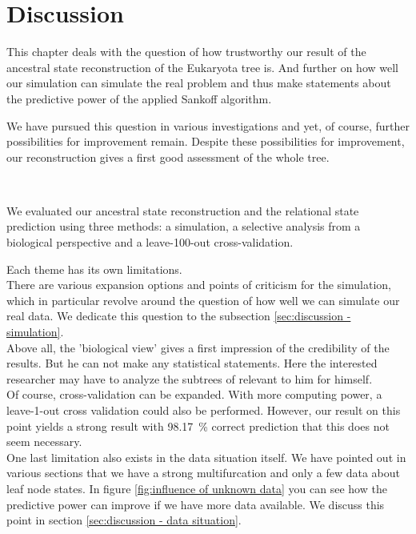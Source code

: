\chapter{Discussion}
  This chapter deals with the question of how trustworthy our result of the ancestral state 
    reconstruction of the Eukaryota tree is. And further on how well our simulation can simulate the 
    real problem and thus make statements about the predictive power of the applied Sankoff algorithm.

  We have pursued this question in various investigations and yet, of course, further possibilities 
    for improvement remain. Despite these possibilities for improvement, our reconstruction gives a 
    first good assessment of the whole tree.

   \\
  
  We evaluated our ancestral state reconstruction and the relational state prediction using three 
    methods: a simulation, a selective analysis from a biological perspective and a leave-100-out 
    cross-validation.
  
  Each theme has its own limitations. \\
  There are various expansion options and points of criticism for the simulation, which in 
    particular revolve around the question of how well we can simulate our real data. We dedicate 
    this question to the subsection \ref{sec:discussion - simulation}. \\
  Above all, the 'biological view' gives a first impression of the credibility of the results. But 
    he can not make any statistical statements. Here the interested researcher may have to analyze 
    the subtrees of relevant to him for himself. \\
   Of course, cross-validation can be expanded. With more computing power, a leave-1-out cross 
    validation could also be performed. However, our result on this point yields a strong result 
    with 98.17~\% correct prediction that this does not seem necessary. \\
  One last limitation also exists in the data situation itself. We have pointed out in various 
    sections that we have a strong multifurcation and only a few data about leaf node states. In 
    figure \ref{fig:influence of unknown data} you can see how the predictive power can improve if 
    we have more data available. We discuss this point in section 
    \ref{sec:discussion - data situation}.

